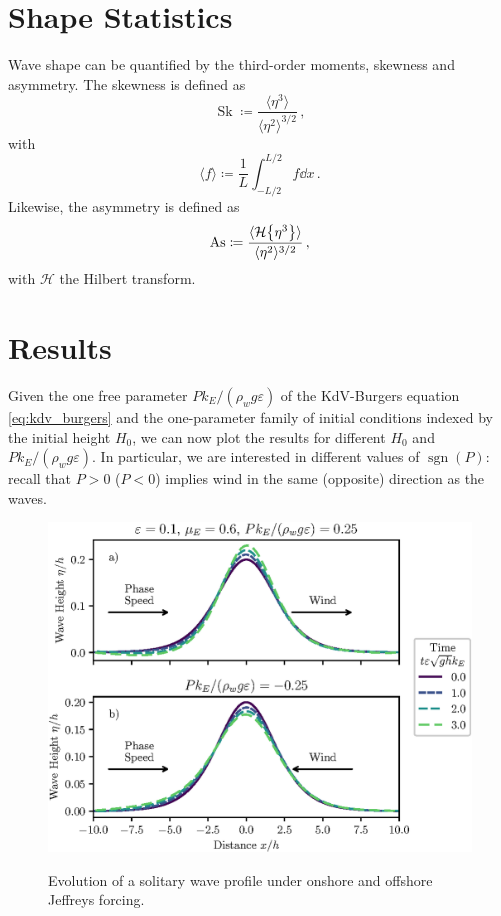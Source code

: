 \documentclass{jfm}
\DeclareMathOperator{\sgn}{sgn}
\DeclareMathOperator{\Sk}{Sk}
\DeclareMathOperator{\As}{As}
\newcommand{\hilbert}{\mathcal{H}}
\renewcommand*{\epsilon}{\varepsilon}
\begin{document}
\section{Shape Statistics}
Wave shape can be quantified by the third-order moments, skewness and
asymmetry.
The skewness is defined as
\begin{equation}
  \Sk \coloneqq \frac{\langle \eta^3 \rangle}{\langle \eta^2
  \rangle^{3/2}} \,,
\end{equation}
with
\begin{equation}
  \langle f \rangle \coloneqq \frac{1}{L} \int_{-L/2}^{L/2} f
  \dd{x} \,.
\end{equation}
Likewise, the asymmetry is defined as
\begin{equation}
  \As \coloneqq \frac{\langle \hilbert \Bqty{\eta^3} \rangle}{\langle
    \eta^2 \rangle^{3/2}} \,,
\end{equation}
with $\hilbert$ the Hilbert transform.

\section{Results}
Given the one free parameter $P k_E/(\rho_w g \epsilon)$ of the
KdV-Burgers equation \cref{eq:kdv_burgers} and the one-parameter family of
initial conditions indexed by the initial height $H_0$, we can now plot the
results for different $H_0$ and $P k_E/(\rho_w g \epsilon)$.
In particular, we are interested in different values of $\sgn(P)$:
recall that $P>0$ ($P<0$) implies wind in the same (opposite) direction
as the waves.

\begin{figure}
  \centering
  { %
    \label{fig:snapshots_solitary:a}
    \label{fig:snapshots_solitary:b}
  }
  \includegraphics{Snapshots-Positive-Negative.eps}
  \caption{
    Evolution of a solitary wave profile under
    onshore and
    offshore Jeffreys forcing.
  }
  \label{fig:snapshots_solitary}
\end{figure}
\end{document}
